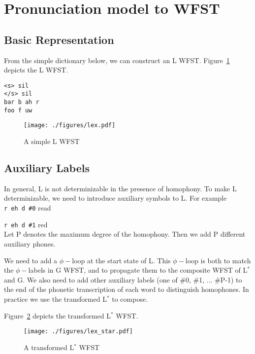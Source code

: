 \section{Pronunciation model to WFST}
\label{sec:lexmod}

\subsection{Basic Representation}
\label{subsubsec:lexrep}

From the simple dictionary below, we can construct an L WFST. Figure~\ref{lex} depicts the L WFST.

\begin{Verbatim}[frame=none, framesep=5mm]
<s> sil
</s> sil
bar b ah r
foo f uw
\end{Verbatim}

\begin{figure}[H]
  \centering
  \texttt{[image: ./figures/lex.pdf]}
  \caption{A simple L WFST}
  \label{lex}
\end{figure}

\subsection{Auxiliary Labels}
\label{lexaux}
In general, L is not determinizable in the presence of homophony. To make L determinizable, we need to introduce auxiliary symbols to L. For example\\

\texttt{r eh d \#0} read

\texttt{r eh d \#1} red \\

Let P denotes the maximum degree of the homophony. Then we add P different auxiliary phones.

We need to add a $\phi-$loop at the start state of L. This $\phi-$loop is both to match the $\phi-$labels in G WFST, and to propagate them to the composite WFST of L$^{*}$ and G. 
We also need to add other auxiliary labels (one of \#0, \#1, ... \#P-1) to the end of the phonetic transcription of each word to distinguish homophones. In practice we use the transformed L$^{*}$ to compose.

Figure~\ref{lexstar} depicts the transformed L$^{*}$ WFST.

\begin{figure}[H]
  \centering
  \texttt{[image: ./figures/lex\_star.pdf]}
  \caption{A transformed L$^{*}$ WFST}
  \label{lexstar}
\end{figure}

